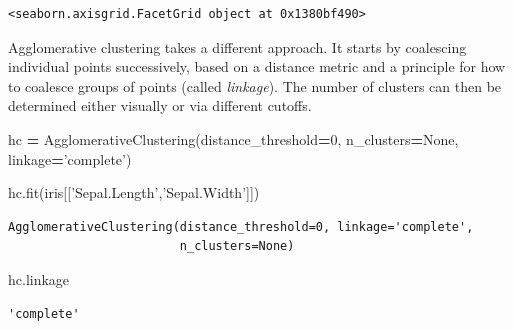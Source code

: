 \documentclass[
  letterpaper,
]{scrbook}
\newenvironment{Shaded}{\begin{snugshade}}{\end{snugshade}}
\newcommand{\DecValTok}[1]{\textcolor[rgb]{0.00,0.00,0.81}{#1}}
\newcommand{\NormalTok}[1]{#1}
\newcommand{\OperatorTok}[1]{\textcolor[rgb]{0.81,0.36,0.00}{\textbf{#1}}}
\newcommand{\StringTok}[1]{\textcolor[rgb]{0.31,0.60,0.02}{#1}}
\newcommand{\VariableTok}[1]{\textcolor[rgb]{0.00,0.00,0.00}{#1}}
\begin{document}
\begin{verbatim}
<seaborn.axisgrid.FacetGrid object at 0x1380bf490>
\end{verbatim}

Agglomerative clustering takes a different approach. It starts by coalescing individual points successively, based on a distance metric and a principle for how to coalesce groups of points (called \emph{linkage}). The number of clusters can then be determined either visually or via different cutoffs.

\begin{Shaded}
\begin{Highlighting}[]
\NormalTok{hc }\OperatorTok{=}\NormalTok{ AgglomerativeClustering(distance_threshold}\OperatorTok{=}\DecValTok{0}\NormalTok{, n_clusters}\OperatorTok{=}\VariableTok{None}\NormalTok{, }
\NormalTok{                             linkage}\OperatorTok{=}\StringTok{'complete'}\NormalTok{)}

\NormalTok{hc.fit(iris[[}\StringTok{'Sepal.Length'}\NormalTok{,}\StringTok{'Sepal.Width'}\NormalTok{]])}
\end{Highlighting}
\end{Shaded}

\begin{verbatim}
AgglomerativeClustering(distance_threshold=0, linkage='complete',
                        n_clusters=None)
\end{verbatim}

\begin{Shaded}
\begin{Highlighting}[]
\NormalTok{hc.linkage}
\end{Highlighting}
\end{Shaded}

\begin{verbatim}
'complete'
\end{verbatim}
\end{document}

